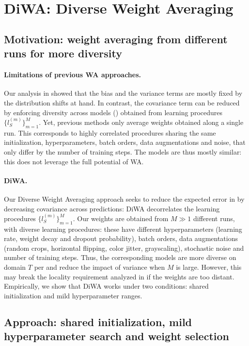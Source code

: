 \section{DiWA: Diverse Weight Averaging}%
\label{sect:dwa}%
\subsection{Motivation: weight averaging from different runs for more diversity}%
\label{subsec:diversitybydifferentruns}%
\paragraph{Limitations of previous WA approaches.}
Our analysis in  showed that the bias and the variance terms are mostly fixed by the distribution shifts at hand.
In contrast, the covariance term can be reduced by enforcing diversity across models () obtained from learning procedures $\{l_S^{(m)}\}_{m=1}^M$.
Yet, previous methods \cite{cha2021wad,arpit2021ensemble} only average weights obtained along a single run.
This corresponds to highly correlated procedures sharing the same initialization, hyperparameters, batch orders, data augmentations and noise, that only differ by the number of training steps. The models are thus mostly similar: this does not leverage the full potential of WA.

\paragraph{DiWA.}
Our Diverse Weight Averaging approach seeks to reduce the \ood expected error in  by decreasing covariance across predictions: DiWA decorrelates the learning procedures $\{l_S^{(m)}\}_{m=1}^M$.
Our weights are obtained from $M\gg 1$ different runs, with diverse learning procedures: these have different hyperparameters (learning rate, weight decay and dropout probability), batch orders, data augmentations (\eg random crops, horizontal flipping, color jitter, grayscaling), stochastic noise and number of training steps.
Thus, the corresponding models are more diverse on domain $T$ per \cite{gontijolopes2022no} and reduce the impact of variance when $M$ is large.
However, this may break the locality requirement analyzed in  if the weights are too distant. Empirically, we show that DiWA works under two conditions: shared initialization and mild hyperparameter ranges.%
\subsection{Approach: shared initialization, mild hyperparameter search and weight selection}%
\label{subsec:sharedinithpws}%
